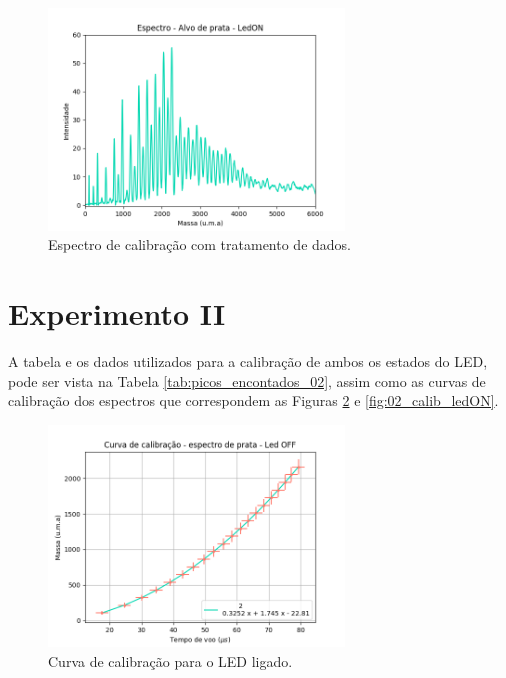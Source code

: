 \begin{figure}
  \centering  
  \includegraphics[width=0.7\textwidth]{exp_01/LEDON_espec_calib_ag_massa.png}
  \caption{Espectro de calibração com tratamento de dados.}
  \label{fig:01_ledon_massa} 
\end{figure}


\section{Experimento II}
A tabela e os dados utilizados para a calibração de ambos os estados do LED, pode ser vista na Tabela \ref{tab:picos_encontados_02}, assim como as curvas de calibração dos espectros que correspondem as Figuras \ref{fig:02_calib_ledOFF} e \ref{fig:02_calib_ledON}.

\begin{figure}
  \centering  
  \includegraphics[width=0.7\textwidth]{exp_02/LEDOFF_curv+erro_calib.png}
  \caption{Curva de calibração para o LED ligado.}
  \label{fig:02_calib_ledOFF} 
\end{figure}

